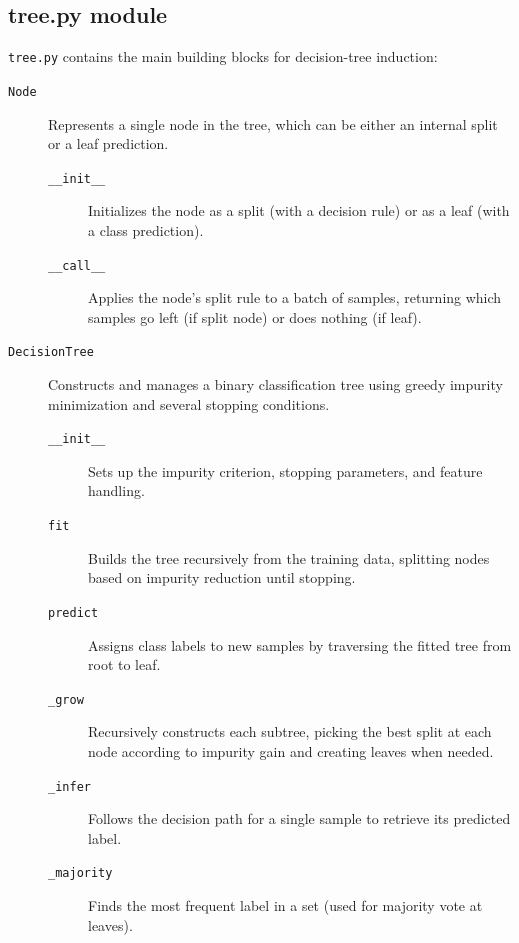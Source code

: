 \documentclass[12pt]{report}
\begin{document}
\subsection{tree.py module}
\texttt{tree.py} contains the main building blocks for decision-tree induction:

\begin{description}
  \item[\texttt{Node}]
        Represents a single node in the tree, which can be either an internal split or
        a leaf prediction.
    \begin{description}
      \item[\texttt{\_\_init\_\_}]
            Initializes the node as a split (with a decision rule) or as a leaf (with a
            class prediction).
      \item[\texttt{\_\_call\_\_}]
            Applies the node's split rule to a batch of samples, returning which
            samples go left (if split node) or does nothing (if leaf).
    \end{description}

  \item[\texttt{DecisionTree}]
        Constructs and manages a binary classification tree using greedy impurity
        minimization and several stopping conditions.
    \begin{description}
      \item[\texttt{\_\_init\_\_}]
            Sets up the impurity criterion, stopping parameters, and feature handling.
      \item[\texttt{fit}]
            Builds the tree recursively from the training data, splitting nodes based
            on impurity reduction until stopping.
      \item[\texttt{predict}]
            Assigns class labels to new samples by traversing the fitted tree from root
            to leaf.
      \item[\texttt{\_grow}]
            Recursively constructs each subtree, picking the best split at each node
            according to impurity gain and creating leaves when needed.
      \item[\texttt{\_infer}]
            Follows the decision path for a single sample to retrieve its predicted
            label.
      \item[\texttt{\_majority}]
            Finds the most frequent label in a set (used for majority vote at leaves).
    \end{description}
\end{description}
\end{document}
